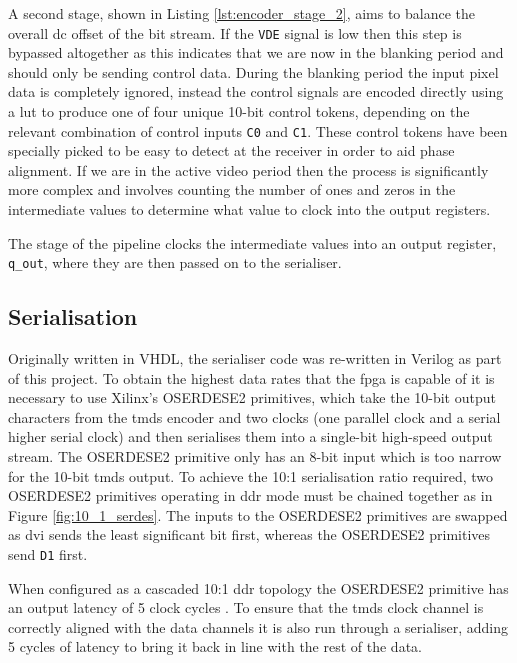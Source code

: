 A second stage, shown in Listing \ref{lst:encoder_stage_2}, aims to balance the overall \gls{dc} offset of the bit stream. If the \texttt{VDE} signal is low then this step is bypassed altogether as this indicates that we are now in the blanking period and should only be sending control data. During the blanking period the input pixel data is completely ignored, instead the control signals are encoded directly using a \gls{lut} to produce one of four unique 10-bit control tokens, depending on the relevant combination of control inputs \texttt{C0} and \texttt{C1}. These control tokens have been specially picked to be easy to detect at the receiver in order to aid phase alignment. If we are in the active video period then the process is significantly more complex and involves counting the number of ones and zeros in the intermediate values to determine what value to clock into the output registers.

The stage of the pipeline clocks the intermediate values into an output register, \texttt{q\_out}, where they are then passed on to the serialiser.

\subsection{Serialisation}

Originally written in VHDL, the serialiser code was re-written in Verilog as part of this project. To obtain the highest data rates that the \gls{fpga} is capable of it is necessary to use Xilinx's OSERDESE2 primitives, which take the 10-bit output characters from the \gls{tmds} encoder and two clocks (one parallel clock and a serial higher serial clock) and then serialises them into a single-bit high-speed output stream. The OSERDESE2 primitive only has an 8-bit input which is too narrow for the 10-bit \gls{tmds} output. To achieve the 10:1 serialisation ratio required, two OSERDESE2 primitives operating in \gls{ddr} mode must be chained together as in Figure \ref{fig:10_1_serdes}. The inputs to the OSERDESE2 primitives are swapped as \gls{dvi} sends the least significant bit first, whereas the OSERDESE2 primitives send \texttt{D1} first.

When configured as a cascaded 10:1 \gls{ddr} topology the OSERDESE2 primitive has an output latency of 5 clock cycles \cite{xilinx:ug471}. To ensure that the \gls{tmds} clock channel is correctly aligned with the data channels it is also run through a serialiser, adding 5 cycles of latency to bring it back in line with the rest of the data.

